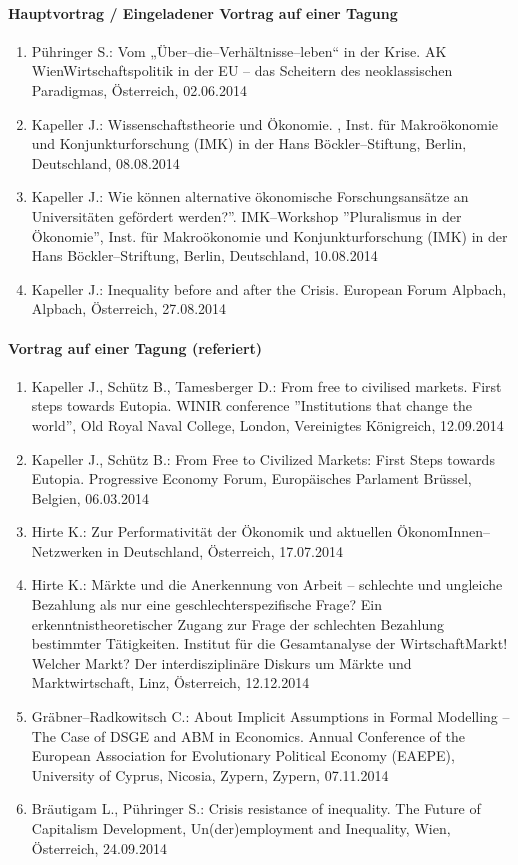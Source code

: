 \paragraph{Hauptvortrag / Eingeladener Vortrag auf einer Tagung}
\begin{enumerate}
	\item Pühringer S.: Vom „Über--die--Verhältnisse--leben“ in der Krise. AK WienWirtschaftspolitik in der EU – das Scheitern des neoklassischen Paradigmas, Österreich, 02.06.2014
	\item Kapeller J.: Wissenschaftstheorie und Ökonomie. , Inst. für Makroökonomie und Konjunkturforschung (IMK) in der Hans Böckler--Stiftung, Berlin, Deutschland, 08.08.2014
	\item Kapeller J.: Wie können alternative ökonomische Forschungsansätze an Universitäten gefördert werden?''. IMK--Workshop ''Pluralismus in der Ökonomie'', Inst. für Makroökonomie und Konjunkturforschung (IMK) in der Hans Böckler--Striftung, Berlin, Deutschland, 10.08.2014
	\item Kapeller J.: Inequality before and after the Crisis. European Forum Alpbach, Alpbach, Österreich, 27.08.2014
\end{enumerate}
\paragraph{Vortrag auf einer Tagung (referiert)}
\begin{enumerate}
	\item Kapeller J., Schütz B., Tamesberger D.: From free to civilised markets. First steps towards Eutopia. WINIR conference ''Institutions that change the world'', Old Royal Naval College, London, Vereinigtes Königreich, 12.09.2014
	\item Kapeller J., Schütz B.: From Free to Civilized Markets: First Steps towards Eutopia. Progressive Economy Forum, Europäisches Parlament Brüssel, Belgien, 06.03.2014
	\item Hirte K.: Zur Performativität der Ökonomik und aktuellen ÖkonomInnen--Netzwerken in Deutschland, Österreich, 17.07.2014
	\item Hirte K.: Märkte und die Anerkennung von Arbeit – schlechte und ungleiche Bezahlung als nur eine geschlechterspezifische Frage? Ein erkenntnistheoretischer Zugang zur Frage der schlechten Bezahlung bestimmter Tätigkeiten. Institut für die Gesamtanalyse der WirtschaftMarkt! Welcher Markt? Der interdisziplinäre Diskurs um Märkte und Marktwirtschaft, Linz, Österreich, 12.12.2014
	\item Gräbner--Radkowitsch C.: About Implicit Assumptions in Formal Modelling – The Case of DSGE and ABM in Economics. Annual Conference of the European Association for Evolutionary Political Economy (EAEPE), University of Cyprus, Nicosia, Zypern, Zypern, 07.11.2014
	\item Bräutigam L., Pühringer S.: Crisis resistance of inequality. The Future of Capitalism Development, Un(der)employment and Inequality, Wien, Österreich, 24.09.2014
\end{enumerate}
